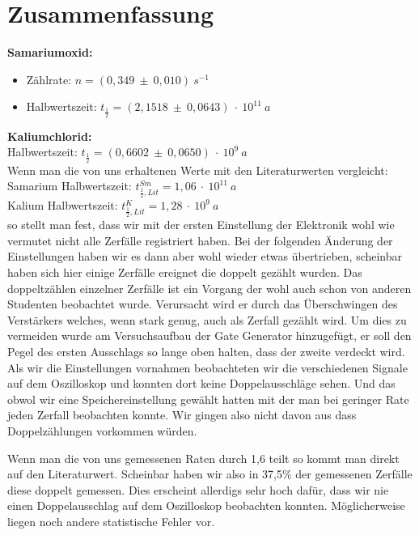 \documentclass[12pt]{article}
\begin{document}
\section{Zusammenfassung}
\textbf{Samariumoxid:} \\
\begin{itemize}
 \item Zählrate: $n = (0,349~\pm~0,010)~s^{-1}$
 \item Halbwertszeit: $t_{\frac{1}{2}} = (2,1518~\pm~0,0643)~\cdot~10^{11}~a$
\end{itemize}

\textbf{Kaliumchlorid:} \\
Halbwertszeit: $t_{\frac{1}{2}} = (0,6602~\pm~0,0650)~\cdot~10^9~a$\\

Wenn man die von uns erhaltenen Werte mit den Literaturwerten vergleicht:
Samarium Halbwertszeit: $t_{\frac{1}{2}, Lit}^{Sm} = 1,06~\cdot~10^{11}~a$\\
Kalium Halbwertszeit: $t_{\frac{1}{2}, Lit}^K = 1,28~\cdot~10^{9}~a$\\
so stellt man fest, dass wir mit der ersten Einstellung der Elektronik wohl wie vermutet nicht alle Zerfälle registriert haben. Bei der folgenden Änderung der Einstellungen haben wir es dann aber wohl wieder etwas übertrieben, scheinbar haben sich hier einige Zerfälle ereignet die doppelt gezählt wurden.
Das doppeltzählen einzelner Zerfälle ist ein Vorgang der wohl auch schon von anderen Studenten beobachtet wurde. Verursacht wird er durch das Überschwingen des Verstärkers welches, wenn stark genug, auch als Zerfall gezählt wird. Um dies zu vermeiden wurde am Versuchsaufbau der Gate Generator hinzugefügt, er soll den Pegel des ersten Ausschlags so lange oben halten, dass der zweite verdeckt wird. Als wir die Einstellungen vornahmen beobachteten wir die verschiedenen Signale auf dem Oszilloskop und konnten dort keine Doppelausschläge sehen. Und das obwol wir eine Speichereinstellung gewählt hatten mit der man bei geringer Rate jeden Zerfall beobachten konnte. Wir gingen also nicht davon aus dass Doppelzählungen vorkommen würden.

Wenn man die von uns gemessenen Raten durch 1,6 teilt so kommt man direkt auf den Literaturwert. Scheinbar haben wir also in 37,5\% der gemessenen Zerfälle diese doppelt gemessen. 
Dies erscheint allerdigs sehr hoch dafür, dass wir nie einen Doppelausschlag auf dem Oszilloskop beobachten konnten. Möglicherweise liegen noch andere statistische Fehler vor.
\end{document}
